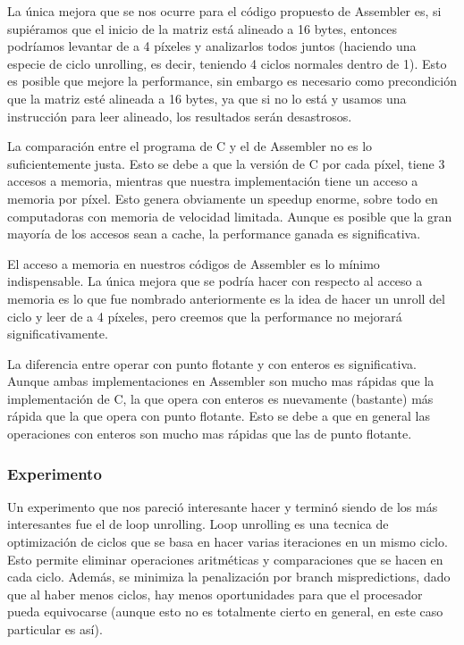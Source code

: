 La única mejora que se nos ocurre para el código propuesto de Assembler es, si supiéramos que el inicio de la matriz está alineado a 16 bytes, entonces podríamos levantar de a 4 píxeles y analizarlos todos juntos (haciendo una especie de ciclo unrolling, es decir, teniendo 4 ciclos normales dentro de 1).
Esto es posible que mejore la performance, sin embargo es necesario como precondición que la matriz esté alineada a 16 bytes, ya que si no lo está y usamos una instrucción para leer alineado, los resultados serán desastrosos.

La comparación entre el programa de C y el de Assembler no es lo suficientemente justa. Esto se debe a que la versión de C por cada píxel, tiene 3 accesos a memoria, mientras que nuestra implementación tiene un acceso a memoria por píxel. Esto genera obviamente un speedup enorme, sobre todo en computadoras con memoria de velocidad limitada.
Aunque es posible que la gran mayoría de los accesos sean a cache, la performance ganada es significativa.

El acceso a memoria en nuestros códigos de Assembler es lo mínimo indispensable. La única mejora que se podría hacer con respecto al acceso a memoria es lo que fue nombrado anteriormente es la idea de hacer un unroll del ciclo y leer de a 4 píxeles, pero creemos que la performance no mejorará significativamente.

La diferencia entre operar con punto flotante y con enteros es significativa. Aunque ambas implementaciones en Assembler son mucho mas rápidas que la implementación de C, la que opera con enteros es nuevamente (bastante) más rápida que la que opera con punto flotante. Esto se debe a que en general las operaciones con enteros son mucho mas rápidas que las de punto flotante.

\subsubsection*{Experimento}

Un experimento que nos pareció interesante hacer y terminó siendo de los más interesantes fue el de loop unrolling. Loop unrolling es una tecnica de optimización de ciclos que se basa en hacer varias iteraciones en un mismo ciclo.
Esto permite eliminar operaciones aritméticas y comparaciones que se hacen en cada ciclo. Además, se minimiza la penalización por branch mispredictions, dado que al haber menos ciclos, hay menos oportunidades para que el procesador pueda equivocarse (aunque esto no es totalmente cierto en general, en este caso particular es así).

